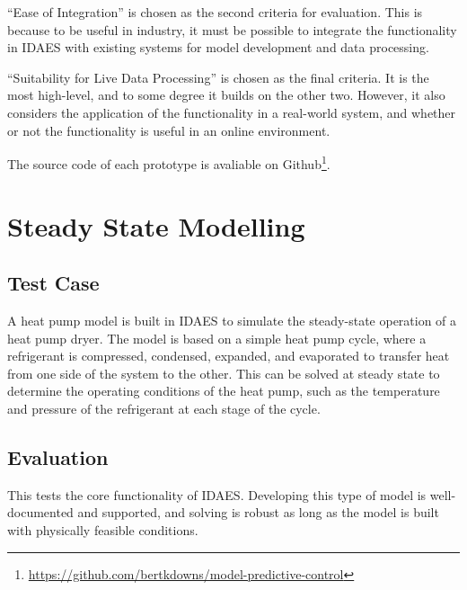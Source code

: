 \documentclass[12pt]{article}
\begin{document}
``Ease of Integration'' is chosen as the second criteria for evaluation. This is because to be useful in industry, it must be possible to integrate the functionality in IDAES with existing systems for model development and data processing.

``Suitability for Live Data Processing'' is chosen as the final criteria. It is the most high-level, and to some degree it builds on the other two. However, it also considers the application of the functionality in a real-world system, and whether or not the functionality is useful in an online environment.

The source code of each prototype is avaliable on Github\footnote{\href{https://github.com/bertkdowns/model-predictive-control}{https://github.com/bertkdowns/model-predictive-control}}.

\section{Steady State Modelling}


\subsection{Test Case}

A heat pump model is built in IDAES to simulate the steady-state operation of a heat pump dryer. The model is based on a simple heat pump cycle, where a refrigerant is compressed, condensed, expanded, and evaporated to transfer heat from one side of the system to the other. This can be solved at steady state to determine the operating conditions of the heat pump, such as the temperature and pressure of the refrigerant at each stage of the cycle.


\subsection{Evaluation}

This tests the core functionality of IDAES. Developing this type of model is well-documented and supported, and solving is robust as long as the model is built with physically feasible conditions.
\end{document}
